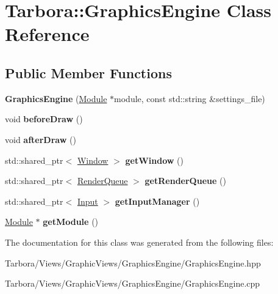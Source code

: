 \hypertarget{classTarbora_1_1GraphicsEngine}{}\section{Tarbora\+:\+:Graphics\+Engine Class Reference}
\label{classTarbora_1_1GraphicsEngine}
\subsection*{Public Member Functions}
\begin{DoxyCompactItemize}
\item 
\mbox{\label{classTarbora_1_1GraphicsEngine_a790ece88a0d85e7cffdaa93072701f86}} 
{\bfseries Graphics\+Engine} (\hyperlink{classTarbora_1_1Module}{Module} $\ast$module, const std\+::string \&settings\+\_\+file)
\item 
\mbox{\label{classTarbora_1_1GraphicsEngine_a8a00110a43890767bc2f00f0fe855f9b}} 
void {\bfseries before\+Draw} ()
\item 
\mbox{\label{classTarbora_1_1GraphicsEngine_a0e929d09863ced274d20980268453869}} 
void {\bfseries after\+Draw} ()
\item 
\mbox{\label{classTarbora_1_1GraphicsEngine_a8f59fcb64bcb9aba4fec1acec076eb84}} 
std\+::shared\+\_\+ptr$<$ \hyperlink{classTarbora_1_1Window}{Window} $>$ {\bfseries get\+Window} ()
\item 
\mbox{\label{classTarbora_1_1GraphicsEngine_a42a15fe1c1a89ec929b837be6594b5f9}} 
std\+::shared\+\_\+ptr$<$ \hyperlink{classTarbora_1_1RenderQueue}{Render\+Queue} $>$ {\bfseries get\+Render\+Queue} ()
\item 
\mbox{\label{classTarbora_1_1GraphicsEngine_ad02c346769f3cef4778f969cf96ab3f4}} 
std\+::shared\+\_\+ptr$<$ \hyperlink{classTarbora_1_1Input}{Input} $>$ {\bfseries get\+Input\+Manager} ()
\item 
\mbox{\label{classTarbora_1_1GraphicsEngine_af11e3691a81a82743499b9f5b9a6f096}} 
\hyperlink{classTarbora_1_1Module}{Module} $\ast$ {\bfseries get\+Module} ()
\end{DoxyCompactItemize}


The documentation for this class was generated from the following files\+:\begin{DoxyCompactItemize}
\item 
Tarbora/\+Views/\+Graphic\+Views/\+Graphics\+Engine/Graphics\+Engine.\+hpp\item 
Tarbora/\+Views/\+Graphic\+Views/\+Graphics\+Engine/Graphics\+Engine.\+cpp\end{DoxyCompactItemize}

